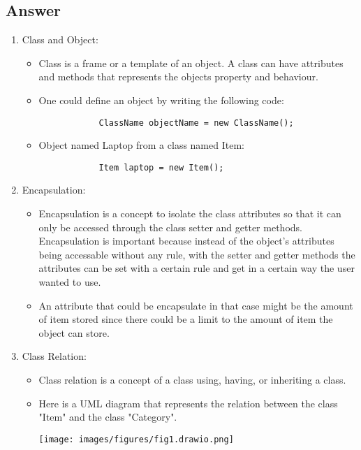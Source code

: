 \documentclass[12pt,titlepage]{article}
\begin{document}
\newpage
\subsection{Answer}
\begin{enumerate}
    \item Class and Object:
    \begin{itemize}
        \item Class is a frame or a template of an object. A class can have attributes and methods that represents the objects property and behaviour. 
        \item One could define an object by writing the following code:
        \begin{verbatim}
            ClassName objectName = new ClassName();
        \end{verbatim}
        \item Object named Laptop from a class named Item:
        \begin{verbatim}
            Item laptop = new Item();
        \end{verbatim}
    \end{itemize}
    \item Encapsulation:
    \begin{itemize}
        \item Encapsulation is a concept to isolate the class attributes so that it can only be accessed through the class setter and getter methods. Encapsulation is important because instead of the object's attributes being accessable without any rule, with the setter and getter methods the attributes can be set with a certain rule and get in a certain way the user wanted to use.
        \item An attribute that could be encapsulate in that case might be the amount of item stored since there could be a limit to the amount of item the object can store. 
    \end{itemize}
    \item Class Relation:
    \begin{itemize}
        \item Class relation is a concept of a class using, having, or inheriting a class.
        \item Here is a UML diagram that represents the relation between the class "Item" and the class "Category".
        \begin{center}
            \texttt{[image: images/figures/fig1.drawio.png]}
        \end{center}

\end{itemize}
\end{enumerate}
\end{document}

